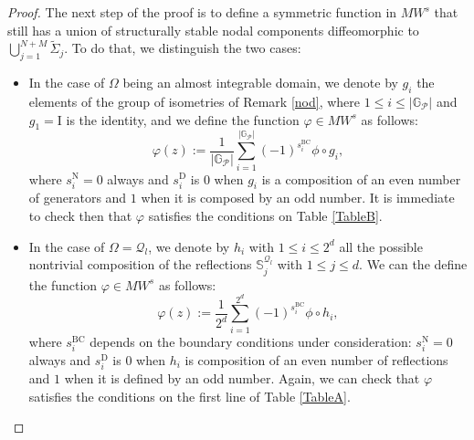 \documentclass{amsart}
\theoremstyle{definition}
\theoremstyle{remark}
\newcommand{\de}{\delta}
\newcommand{\ep}{\varepsilon}
\newcommand{\vp}{\varphi}
\newcommand{\Si}{\Sigma}
\def\RR{\mathbb{R}}
\newcommand{\id}{{\rm id}}
\renewcommand\leq\leqslant
\numberwithin{equation}{section}
\theoremstyle{definition}
\theoremstyle{remark}
\def\RR{\mathbb{R}}
\newcommand{\I}{{\mathrm I}}
\begin{document}
\begin{proof}
    
The next step of the proof is to define a symmetric function in $MW^s$ that still has a union of structurally stable nodal components diffeomorphic to $\bigcup_{j=1}^{N+M}\tilde{\Si}_j$. To do that, we distinguish the two cases:\begin{itemize}
    \item In the case of $\Omega$ being an almost integrable domain, we denote by $g_i$ the elements of the group of isometries of Remark \ref{nod}, where $1\leq i\leq \left|\mathbb{G}_\mathcal{P}\right|$ and $g_1=\I$ is the identity, and we define the function $\varphi\in MW^s$ as follows: \begin{equation}
        \varphi(z):=\frac{1}{\left|\mathbb{G}_\mathcal{P}\right|}\sum_{i=1}^{\left|\mathbb{G}_\mathcal{P}\right|}\left(-1\right)^{s_i^{\mathrm{BC}}}\phi\circ g_i,
    \end{equation}where $s_i^{\mathrm{N}}=0$ always and $s_i^{\mathrm{D}}$ is $0$ when $g_i$ is a composition of an even number of generators and $1$ when it is composed by an odd number. It is immediate to check then that $\vp$ satisfies the conditions on Table \ref{TableB}.
    
    \item In the case of $\Omega=\mathcal{Q}_l$, we denote by $h_i$ with $1\leq i\leq 2^d$ all the possible nontrivial composition of the reflections $\mathbb{S}_j^{\mathcal{Q}_l}$ with $1\leq j\leq d$. We can the define the function $\varphi\in MW^s$ as follows: 
    \begin{equation}
        \varphi(z):=\frac{1}{2^d}\sum_{i=1}^{2^d}\left(-1\right)^{s_i^{\mathrm{BC}}}\phi\circ h_i,
    \end{equation}where $s_i^{\mathrm{BC}}$ depends on the boundary conditions under consideration:  $s_i^{\mathrm{N}}=0$ always and $s_i^{\mathrm{D}}$ is $0$ when $h_i$ is composition of an even number of reflections and $1$ when it is defined by an odd number. Again, we can check that $\vp$ satisfies the conditions on the first line of Table \ref{TableA}.
    \end{itemize}


\end{proof}
\end{document}
